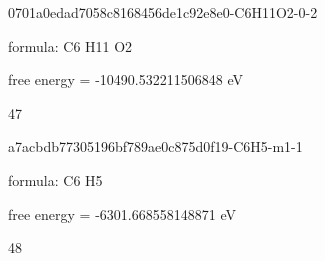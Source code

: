 \documentclass{article}
\begin{document}
\vspace{1cm}


0701a0edad7058c8168456de1c92e8e0-C6H11O2-0-2



formula: C6 H11 O2



free energy = -10490.532211506848 eV

47

\vspace{1cm}


a7acbdb77305196bf789ae0c875d0f19-C6H5-m1-1



formula: C6 H5



free energy = -6301.668558148871 eV

48
\end{document}
